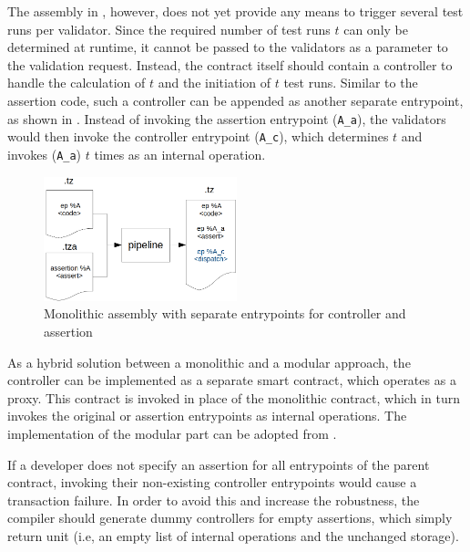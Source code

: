 The assembly in , however, does not yet provide any means to trigger several test runs per validator. Since the required number of test runs $t$ can only be determined at runtime, it cannot be passed to the validators as a parameter to the validation request. Instead, the contract itself should contain a controller to handle the calculation of $t$ and the initiation of $t$ test runs. Similar to the assertion code, such a controller can be appended as another separate entrypoint, as shown in . Instead of invoking the assertion entrypoint (\texttt{A\_a}), the validators would then invoke the controller entrypoint (\texttt{A\_c}), which determines $t$ and invokes (\texttt{A\_a}) $t$ times as an internal operation.
\begin{figure}[h]
\centering
  \includegraphics[width=0.5\textwidth]{figures/5-offline_tezos/pipeline_output_mono_ep}
	\caption{Monolithic assembly with separate entrypoints for controller and assertion}
	\label{fig:monolithic_orchestration}
\end{figure}

As a hybrid solution between a monolithic and a modular approach, the controller can be implemented as a separate smart contract, which operates as a proxy. This contract is invoked in place of the monolithic contract, which in turn invokes the original or assertion entrypoints as internal operations. The implementation of the modular part can be adopted from .

If a developer does not specify an assertion for all entrypoints of the parent contract, invoking their non-existing controller entrypoints would cause a transaction failure. In order to avoid this and increase the robustness, the compiler should generate dummy controllers for empty assertions, which simply return unit (i.e, an empty list of internal operations and the unchanged storage).

